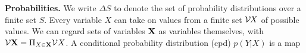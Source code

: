     \textbf{Probabilities.}
We write $\Delta S$ to denote the set of probability distributions over a finite set $S$.
Every variable $X$ can take on values from a finite set
$\mathcal V\mskip-1.5mu X$
of possible values.
We can regard sets of variables $\mathbf{X}$ as variables themselves, with
$\mathcal V \mathbf{X} = \Pi_{X \in \mathbf{X}} \mathcal V X$.
A conditional probability distribution (cpd) $p(Y|X)$ is a map
